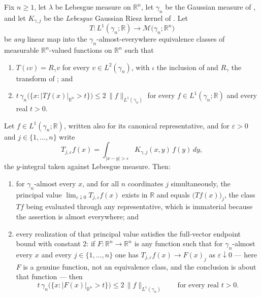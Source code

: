 \begin{theorem}
Fix $n \geq 1$, let $\lambda$ be Lebesgue measure on $\mathbb{R}^n$, let
$\gamma_n$ be the Gaussian measure of , and let
$K_{\gamma,j}$ be the \emph{Lebesgue} Gaussian Riesz kernel of
.  Let
\[
  T : L^1(\gamma_n;\mathbb{R}) \longrightarrow
      \mathcal{M}\bigl(\gamma_n;\mathbb{R}^n\bigr)
\]
be \emph{any} linear map into the $\gamma_n$-almost-everywhere equivalence
classes of measurable $\mathbb{R}^n$-valued functions on $\mathbb{R}^n$ such
that
\begin{enumerate}
\item[(T1)] $T(\iota v) = R_\gamma v$ for every $v \in L^2(\gamma_n)$, with
$\iota$ the inclusion of  and $R_\gamma$ the transform of
; and
\item[(T2)] $t\,\gamma_n\bigl(\{x : |Tf(x)|_{\mathbb{R}^n} > t\}\bigr)
\leq 2\,\|f\|_{L^1(\gamma_n)}$ for every $f \in L^1(\gamma_n;\mathbb{R})$ and
every real $t > 0$.
\end{enumerate}
Let $f \in L^1(\gamma_n;\mathbb{R})$, written also for its canonical
representative, and for $\varepsilon > 0$ and $j \in \{1,\ldots,n\}$ write
\[
  T_{j,\varepsilon}f(x)
    = \int_{|x-y|>\varepsilon}K_{\gamma,j}(x,y)\,f(y)\,dy ,
\]
the $y$-integral taken against Lebesgue measure.  Then:
\begin{enumerate}
\item for $\gamma_n$-almost every $x$, and for all $n$ coordinates $j$
simultaneously, the principal value
$\lim_{\varepsilon\downarrow0}T_{j,\varepsilon}f(x)$ exists in $\mathbb{R}$ and
equals $\bigl(Tf(x)\bigr)_j$, the class $Tf$ being evaluated through any
representative, which is immaterial because the assertion is almost
everywhere; and
\item every realization of that principal value satisfies the full-vector
endpoint bound with constant $2$: if $F : \mathbb{R}^n \to \mathbb{R}^n$ is any
function such that for $\gamma_n$-almost every $x$ and every
$j \in \{1,\ldots,n\}$ one has
$T_{j,\varepsilon}f(x) \to F(x)_j$ as $\varepsilon \downarrow 0$ --- here $F$ is
a genuine function, not an equivalence class, and the conclusion is about that
function --- then
\[
  t\,\gamma_n\bigl(\{x : |F(x)|_{\mathbb{R}^n} > t\}\bigr)
    \leq 2\,\|f\|_{L^1(\gamma_n)}
  \qquad\text{for every real } t > 0 .
\]
\end{enumerate}


\end{theorem}
